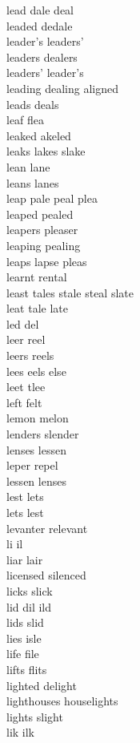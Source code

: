 lead dale deal\\
leaded dedale\\
leader's leaders'\\
leaders dealers\\
leaders' leader's\\
leading dealing aligned\\
leads deals\\
leaf flea\\
leaked akeled\\
leaks lakes slake\\
lean lane\\
leans lanes\\
leap pale peal plea\\
leaped pealed\\
leapers pleaser\\
leaping pealing\\
leaps lapse pleas\\
learnt rental\\
least tales stale steal slate\\
leat tale late\\
led del\\
leer reel\\
leers reels\\
lees eels else\\
leet tlee\\
left felt\\
lemon melon\\
lenders slender\\
lenses lessen\\
leper repel\\
lessen lenses\\
lest lets\\
lets lest\\
levanter relevant\\
li il\\
liar lair\\
licensed silenced\\
licks slick\\
lid dil ild\\
lids slid\\
lies isle\\
life file\\
lifts flits\\
lighted delight\\
lighthouses houselights\\
lights slight\\
lik ilk\\
